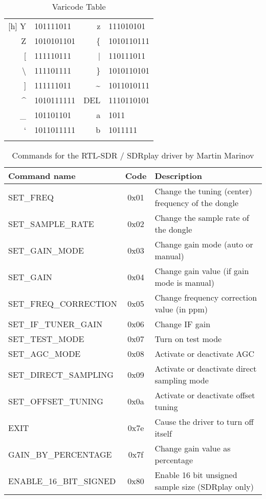 \begin{longtable}{ r l || r l }[h]
	Y   & 101111011 				&	z   & 111010101  \\
	Z   & 1010101101 				&	\{   & 1010110111  \\
	{[}   & 111110111 				&	|   & 110111011  \\
	\textbackslash  & 111101111 	& 	\}   & 1010110101  \\
	{]}   & 111111011 				&	\textasciitilde   & 1011010111  \\
	\textasciicircum   & 1010111111 &	DEL & 1110110101\\
	\_   & 101101101 				&	a   & 1011  \\
	`   & 1011011111 				&	b   & 1011111  \\\hline
	\caption{Varicode Table}
	\label{tab:psk31_varicode}
\end{longtable}

\begin{table}
	\begin{center}
		\begin{tabular}{l c l}
			Command name & Code & Description \\\hline
			SET\_FREQ & 0x01 & Change the tuning (center) frequency of the dongle \\
			SET\_SAMPLE\_RATE & 0x02 & Change the sample rate of the dongle \\
			SET\_GAIN\_MODE & 0x03 & Change gain mode (auto or manual) \\
			SET\_GAIN & 0x04 & Change gain value (if gain mode is manual) \\
			SET\_FREQ\_CORRECTION & 0x05 & Change frequency correction value (in ppm) \\
			SET\_IF\_TUNER\_GAIN & 0x06 & Change \ac{IF} gain \\
			SET\_TEST\_MODE & 0x07 & Turn on test mode \\
			SET\_AGC\_MODE & 0x08 & Activate or deactivate \ac{AGC} \\
			SET\_DIRECT\_SAMPLING & 0x09 & Activate or deactivate direct sampling mode \\
			SET\_OFFSET\_TUNING & 0x0a & Activate or deactivate offset tuning \\
			EXIT & 0x7e & Cause the driver to turn off itself \\
			GAIN\_BY\_PERCENTAGE & 0x7f & Change gain value as percentage \\
			ENABLE\_16\_BIT\_SIGNED & 0x80 & Enable 16 bit unsigned sample size (SDRplay only) \\\hline
		\end{tabular}
		\caption{Commands for the RTL-SDR / SDRplay driver by Martin Marinov}
		\label{tab:sdrplay_cmds}
	\end{center}
\end{table}

